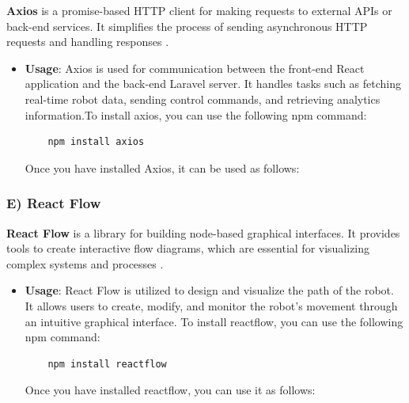 \textbf{Axios} is a promise-based HTTP client for making requests to external APIs or back-end services. It simplifies the process of sending asynchronous HTTP requests and handling responses \cite{axios}.
\vspace{-2mm}
\begin{itemize}
    \item \textbf{Usage}: Axios is used for communication between the front-end React application and the back-end Laravel server. It handles tasks such as fetching real-time robot data, sending control commands, and retrieving analytics information.To install axios, you can use the following
npm command:
        \begin{verbatim}
    npm install axios
    \end{verbatim}
    \vspace{-3mm}
    Once you have installed Axios, it can be used as follows:
    
\end{itemize}


\subsubsection*{E) React Flow}
\textbf{React Flow} is a library for building node-based graphical interfaces. It provides tools to create interactive flow diagrams, which are essential for visualizing complex systems and processes \cite{reactflow} \cite{reactflow-examples}.

\begin{itemize}
    \item \textbf{Usage}: React Flow is utilized to design and visualize the path of the robot. It allows users to create, modify, and monitor the robot's movement through an intuitive graphical interface. To install reactflow, you can use the following
npm command:

            \begin{verbatim}
    npm install reactflow
    \end{verbatim}
    Once you have installed reactflow, you can use it as follows:
    
\end{itemize}


